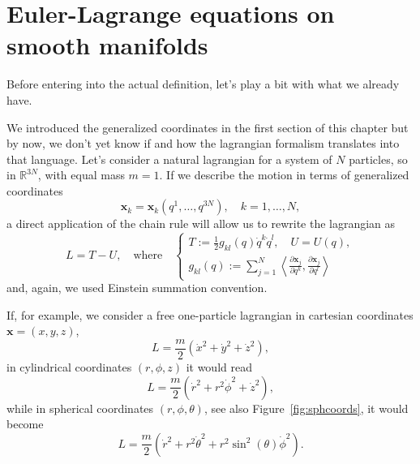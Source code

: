 \documentclass[english,fontsize=11pt,paper=a5,oneside]{scrbook}
\newcommand{\R}{\mathbb{R}}
\newcommand{\bx}{\bm{x}}
\newcommand{\lag}{\langle}
\newcommand{\rag}{\rangle}
\theoremstyle{definition}
\begin{document}
\section{Euler-Lagrange equations on smooth manifolds}\label{sec:lagrangianonmanifold}

Before entering into the actual definition, let's play a bit with what we already have.

We introduced the generalized coordinates in the first section of this chapter but by now, we don't yet know if and how the lagrangian formalism translates into that language.
Let's consider a natural lagrangian for a system of $N$ particles, so in $\R^{3N}$, with equal mass $m=1$.
If we describe the motion in terms of generalized coordinates
\begin{equation}
    \bx_k = \bx_k(q^1, \ldots, q^{3N}), \quad k=1,\ldots,N,
\end{equation}
a direct application of the chain rule will allow us to rewrite the lagrangian as
\begin{equation}
    L = T - U,
    \quad\mbox{where}\quad
    \begin{cases}
        T:= \frac12 g_{kl}(q)\dot q^k \dot q^l, \quad U = U(q),\\
        g_{kl} (q) := \sum_{j=1}^N \left\lag\frac{\partial\bx_j}{\partial q^k}, \frac{\partial \bx_j}{\partial q^l}\right\rag
    \end{cases}
\end{equation}
and, again, we used Einstein summation convention.

If, for example, we consider a free one-particle lagrangian in cartesian coordinates $\bx = (x,y,z)$,
\begin{equation}
    L = \frac m2 (\dot x^2 + \dot y^2 + \dot z^2),
\end{equation}
in cylindrical coordinates $(r,\phi,z)$ it would read
\begin{equation}
    L = \frac m2 (\dot r^2 + r^2 \dot \phi^2 + \dot z^2),
\end{equation}
while in spherical coordinates $(r,\phi,\theta)$, see also Figure~\ref{fig:sphcoords}, it would become
\begin{equation}
    L = \frac m2 (\dot r^2 + r^2 \dot \theta^2 + r^2 \sin^2(\theta) \dot \phi^2).
\end{equation}
\end{document}
